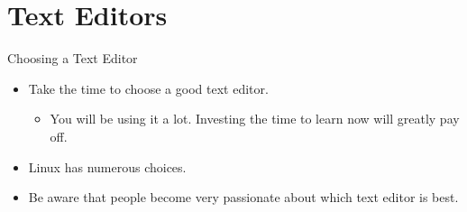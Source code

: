 \documentclass[14pt,aspectratio=1610]{beamer}
\begin{document}

\section{Text Editors}

\begin{frame}{Choosing a Text Editor}
\begin{itemize}[<+->]
\item Take the time to choose a good text editor.
\begin{itemize}
\item You will be using it a lot. Investing the time to learn now will greatly pay off.
\end{itemize}
\item Linux has numerous choices.
\item Be aware that people become very passionate about which text editor is best.
\end{itemize}
\end{frame}
\end{document}
